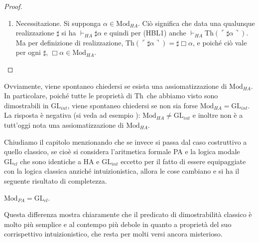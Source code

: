 \begin{proof}
\begin{description}
\begin{enumerate}
\item Necessitazione. Si supponga $\alpha\in\mathrm{Mod}_{HA}$. Ciò significa che data una qualunque realizzazione $\sharp$ si ha $\vdash_{HA}\sharp\alpha$ e quindi per (HBL1) anche $\vdash_{HA}\ensuremath{\mathrm{Th}}(\ulcorner\sharp\alpha\urcorner)$. Ma per definizione di realizzazione, $\ensuremath{\mathrm{Th}}(\ulcorner\sharp\alpha\urcorner)=\sharp\Box\alpha$, e poiché ciò vale per ogni $\sharp$, $\Box\alpha\in\mathrm{Mod}_{HA}$.
\end{enumerate}
\end{description}
\end{proof}

\noindent Ovviamente, viene spontaneo chiedersi se esista una assiomatizzazione di $\mathrm{Mod}_{HA}$. In particolare, poiché tutte le proprietà di \ensuremath{\mathrm{Th}}\ che abbiamo visto sono dimostrabili in $\ensuremath{\mathrm{GL}}_{int}$, viene spontaneo chiedersi se non sia forse $\mathrm{Mod}_{HA}=\ensuremath{\mathrm{GL}}_{int}$. La risposta è negativa (si veda ad esempio \cite{Visser}): $\mathrm{Mod}_{HA}\neq\ensuremath{\mathrm{GL}}_{int}$ e inoltre non è a tutt'oggi nota una assiomatizzazione di $\mathrm{Mod}_{HA}$.

Chiudiamo il capitolo menzionando che se invece si passa dal caso costruttivo a quello classico, se cioè si considera l'aritmetica formale PA e la logica modale $\ensuremath{\mathrm{GL}}_{cl}$ che sono identiche a HA e $\ensuremath{\mathrm{GL}}_{int}$ eccetto per il fatto di essere equipaggiate con la logica classica anziché intuizionistica, allora le cose cambiano e si ha il seguente risultato di completezza.

\begin{thm} $\mathrm{Mod}_{PA}=\ensuremath{\mathrm{GL}}_{cl}$.
\end{thm}

Questa differenza mostra chiaramente che il predicato di dimostrabilità classico è molto più semplice e al contempo più debole in quanto a proprietà del suo corrispettivo intuizionistico, che resta per molti versi ancora misterioso.
